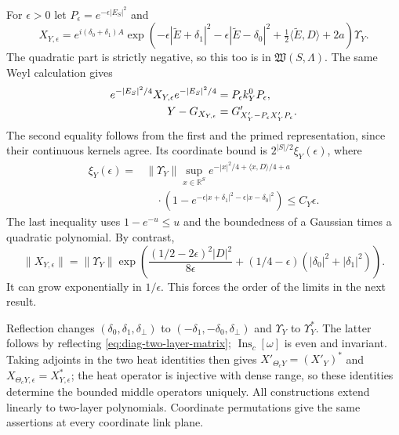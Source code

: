 \documentclass[11pt,letterpaper,reqno]{amsart}
\newcommand{\R}{\mathbb R}
\begin{document}
For $\epsilon>0$ let $P_\epsilon=e^{-\epsilon|E_S|^2}$ and
\begin{equation}\label{eq:diag-two-layer-epsilon}
 X_{Y,\epsilon}=e^{i(\delta_0+\delta_1)A}
  \exp\left(-\epsilon|\widetilde E+\delta_1|^2
       -\epsilon|\widetilde E-\delta_0|^2
       +\tfrac12\langle\widetilde E,D\rangle+2a\right)\Upsilon_Y.
\end{equation}
The quadratic part is strictly negative, so this too is in
$\mathfrak W(S,\Lambda)$. The same Weyl calculation gives
\begin{align}\label{eq:diag-two-layer-approximation}
 e^{-|E_S|^2/4}X_{Y,\epsilon}e^{-|E_S|^2/4}
                      &=P_\epsilon k_Y^0P_\epsilon,\notag\\
 Y-G_{X_{Y,\epsilon}}&=
               G'_{X'_Y-P_\epsilon X'_YP_\epsilon}.
\end{align}
The second equality follows from the first and the primed
representation, since their continuous kernels agree. Its
coordinate bound is $2^{|S|/2}\xi_Y(\epsilon)$, where
\begin{equation}\label{eq:diag-two-layer-error}
 \begin{split}
 \xi_Y(\epsilon)={}&\|\Upsilon_Y\|
       \sup_{x\in\R^S}e^{-|x|^2/4+\langle x,D\rangle/4+a}\\
 &\quad\cdot(1-e^{-\epsilon|x+\delta_1|^2
                         -\epsilon|x-\delta_0|^2})
       \le C_Y\epsilon.
 \end{split}
\end{equation}
The last inequality uses $1-e^{-u}\le u$ and the boundedness
of a Gaussian times a quadratic polynomial. By contrast,
\begin{equation}\label{eq:diag-two-layer-operator-size}
 \|X_{Y,\epsilon}\|
 =\|\Upsilon_Y\|
   \exp\left(\frac{(1/2-2\epsilon)^2|D|^2}{8\epsilon}
                  +(1/4-\epsilon)(|\delta_0|^2+|\delta_1|^2)\right).
\end{equation}
It can grow exponentially in $1/\epsilon$. This forces the
order of the limits in the next result.

Reflection changes $(\delta_0,\delta_1,\delta_\perp)$ to
$(-\delta_1,-\delta_0,\delta_\perp)$ and
$\Upsilon_Y$ to $\Upsilon_Y^*$. The latter follows by reflecting
\eqref{eq:diag-two-layer-matrix}; $\operatorname{Ins}_c[\omega]$
is even and invariant. Taking adjoints in the two heat identities
then gives
$X'_{\Theta_cY}=(X'_Y)^*$ and
$X_{\Theta_cY,\epsilon}=X_{Y,\epsilon}^*$; the heat operator
is injective with dense range, so these identities determine
the bounded middle operators uniquely. All constructions extend
linearly to two-layer polynomials. Coordinate permutations
give the same assertions at every coordinate link plane.
\end{document}

